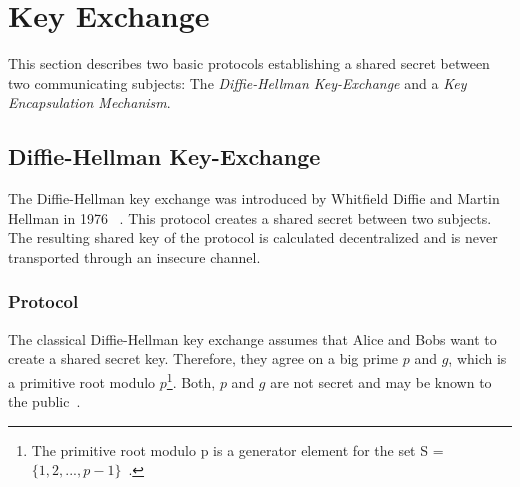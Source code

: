 \section{Key Exchange}
This section describes two basic protocols establishing a shared secret between two communicating subjects: The \textit{Diffie-Hellman Key-Exchange} and a \textit{Key Encapsulation Mechanism}.

\subsection{Diffie-Hellman Key-Exchange}

The Diffie-Hellman key exchange was introduced by Whitfield Diffie and Martin Hellman in 1976 ~\parencite{diffie1976new}. This protocol creates a shared secret between two subjects. The resulting shared key of the protocol is calculated decentralized and is never transported through an insecure channel.

\subsubsection{Protocol}
The classical Diffie-Hellman key exchange assumes that Alice and Bobs want to create a shared secret key. Therefore, they agree on a big prime $p$ and $g$, which is a primitive root modulo $p$\footnote{The primitive root modulo p is a generator element for the set S = $\{1, 2, ... , p-1\}$~\parencite{ITSicherheit}.}. Both, $p$ and $g$ are not secret and may be known to the public~\parencite{watjen2018kryptographie}.

